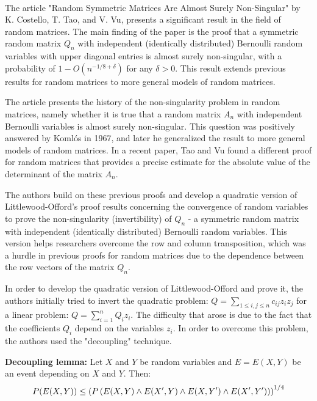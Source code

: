 


~\cite{costello2005random}

The article "Random Symmetric Matrices Are Almost Surely Non-Singular" by K. Costello, T. Tao, and V. Vu, presents a significant result in the field of random matrices. The main finding of the paper is the proof that a symmetric random matrix \( Q_n \) with independent (identically distributed) Bernoulli random variables with upper diagonal entries is almost surely non-singular, with a probability of  \( 1-O(n^{-1/8+\delta}) \) for any \( \delta>0 \). This result extends previous results for random matrices to more general models of random matrices.

The article presents the history of the non-singularity problem in random matrices, namely whether it is true that a random matrix \( A_n \) with independent Bernoulli variables is almost surely non-singular. This question was positively answered by Komlós in 1967, and later he generalized the result to more general models of random matrices. In a recent paper, Tao and Vu found a different proof for random matrices that provides a precise estimate for the absolute value of the determinant of the matrix \( A_n \).

The authors build on these previous proofs and develop a quadratic version of Littlewood-Offord's proof results concerning the convergence of random variables to prove the non-singularity (invertibility) of \( Q_n \) - a symmetric random matrix with independent (identically distributed) Bernoulli random variables. This version helps researchers overcome the row and column transposition, which was a hurdle in previous proofs for random matrices due to the dependence between the row vectors of the matrix \( Q_n \).

In order to develop the quadratic version of Littlewood-Offord and prove it, the authors initially tried to invert the quadratic problem: \( Q=\sum_{1\leq i,j\leq n} c_{ij} z_i z_j \) for a linear problem: \( Q=\sum_{i=1}^n Q_i z_i \). The difficulty that arose is due to the fact that the coefficients \( Q_i \) depend on the variables \( z_i \). In order to overcome this problem, the authors used the "decoupling" technique.
\vspace{\baselineskip}


\textbf{Decoupling lemma:} Let \( X \) and \( Y \) be random variables and \( E=E(X,Y) \) be an event depending on \( X \) and \( Y \). Then:
\vspace{-0.6\baselineskip}
\[ P(E(X,Y)) \leq \left( P\left( E(X,Y) \land E(X',Y) \land E(X,Y') \land E(X',Y') \right) \right)^{1/4} \vspace{-0.5\baselineskip} \]

